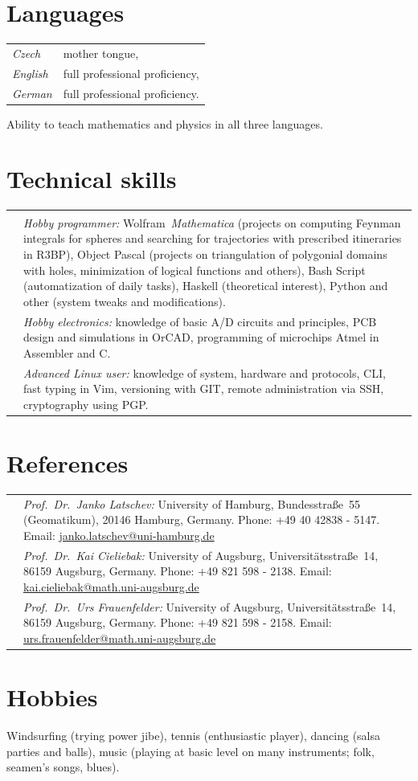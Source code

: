 \documentclass[a4paper,12pt]{article}
\begin{document}
\section*{Languages}
%
\begin{tabularx}{\textwidth}{@{}lX@{}}
\emph{Czech}& mother tongue,\\
\emph{English} & full professional proficiency,\\
\emph{German} & full professional proficiency.
\end{tabularx}
%
Ability to teach mathematics and physics in all three languages.
%
\section*{Technical skills}
%
\begin{tabularx}{\textwidth}{@{}lX@{}}
	\textbullet	&	\emph{Hobby programmer:} Wolfram~\textit{Mathematica}\textsuperscript{\textregistered} (projects on computing Feynman integrals for spheres and searching for trajectories with prescribed itineraries in R3BP), Object Pascal (projects on triangulation of polygonial domains with holes, minimization of logical functions and others), Bash Script (automatization of daily tasks), Haskell (theoretical interest), Python and other (system tweaks and modifications).\\
	\textbullet	&	\emph{Hobby electronics:} knowledge of basic A/D circuits and principles, PCB design and simulations in OrCAD, programming of microchips Atmel in Assembler and C.\\
	\textbullet	&	\emph{Advanced Linux user:} knowledge of system, hardware and protocols, CLI, fast typing in Vim, versioning with GIT, remote administration via SSH, cryptography using PGP.
\end{tabularx}
%
\section*{References}
%
\begin{tabularx}{\textwidth}{@{}lX@{}}
	\textbullet&\emph{Prof.~Dr.~Janko Latschev:} University of Hamburg, Bundesstra\ss e~55 (Geomatikum), 20146 Hamburg, Germany. Phone: +49 40 42838 - 5147. Email: \href{mailto:janko.latschev@uni-hamburg.de}{janko.latschev@uni-hamburg.de}\\
	\textbullet&\emph{Prof.~Dr.~Kai Cieliebak:} University of Augsburg, Universit\"atsstra\ss e~14, 86159 Augsburg, Germany. Phone: +49 821 598 - 2138. Email: \href{mailto:kai.cieliebak@math.uni-augsburg.de}{kai.cieliebak@math.uni-augsburg.de}\\
	\textbullet&\emph{Prof.~Dr.~Urs Frauenfelder:} University of Augsburg, Universit\"atsstra\ss e~14, 86159 Augsburg, Germany. Phone: +49 821 598 - 2158. Email: \href{mailto:urs.frauenfelder@math.uni-augsburg.de}{urs.frauenfelder@math.uni-augsburg.de}
\end{tabularx}
%
\section*{Hobbies}
%
Windsurfing (trying power jibe), tennis (enthusiastic player), dancing (salsa parties and balls), music (playing at basic level on many instruments; folk, seamen's songs, blues).
%
\end{document}
